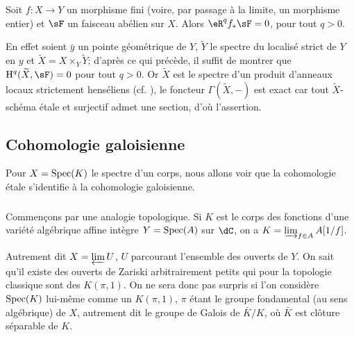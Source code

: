 \begin{proposition}\label{I:2-3-6}
Soit $f:X\to Y$ un morphisme fini (voire, par passage à la limite, un 
morphisme entier) et $\sF$ un faisceau abélien sur $X$. Alors $\eR^q f_* \sF=0$, 
pour tout $q>0$.
\end{proposition}

En effet soient $\bar y$ un pointe géométrique de $Y$, $\widetilde Y$ le 
spectre du localisé strict de $Y$ en $y$ et 
$\widetilde X=X\times_Y \widetilde Y$; d'après ce qui précède, il suffit de 
montrer que $\h^q(\widetilde X,\sF) = 0$ pour tout $q>0$. Or $\widetilde X$ est le 
spectre d'un produit d'anneaux locaux strictement henséliens (cf. 
\cite[I]{ra70}), le foncteur $\Gamma(\widetilde X,-)$ est exact car tout 
$\widetilde X$-schéma étale et surjectif admet une section, d'où l'assertion. 










\subsection{Cohomologie galoisienne}\label{I:2-4}

Pour $X=\operatorname{Spec}(K)$ le spectre d'un corps, nous allons voir que la cohomologie 
étale s'identifie à la cohomologie galoisienne. 





\subsubsection{}\label{I:2-4-1}

Commençons par une analogie topologique. Si $K$ est le corps des fonctions 
d'une variété algébrique affine intègre $Y=\operatorname{Spec}(A)$ sur $\dC$, on a 
$K=\varinjlim_{f\in A} A[1/f]$. 

Autrement dit $X=\varprojlim U$, $U$ parcourant l'ensemble des ouverts de $Y$. 
On sait qu'il existe des ouverts de Zariski arbitrairement petits qui pour la 
topologie classique sont des $K(\pi,1)$. On ne sera donc pas surpris si l'on 
considère $\operatorname{Spec}(K)$ lui-même comme un $K(\pi,1)$, $\pi$ étant le groupe 
fondamental (au sens algébrique) de $X$, autrement dit le groupe de Galois de 
$\bar K/K$, où $\bar K$ est clôture séparable de $K$. 





\subsubsection{}\label{I:2-4-2}

